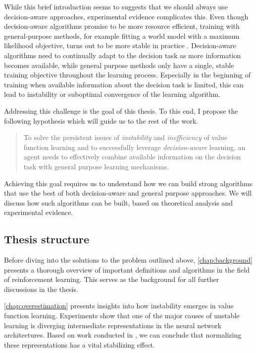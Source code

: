 While this brief introduction seems to suggests that we should always use decision-aware approaches, experimental evidence complicates this.
Even though decision-aware algorithms promise to be more resource efficient, training with general-purpose methods, for example fitting a world model with a maximum likelihood objective, turns out to be more stable in practice \parencite{lovatto2020decision,voelcker2022value}.
Decision-aware algorithms need to continually adapt to the decision task as more information becomes available, while general purpose methods only have a single, stable training objective throughout the learning process.
Especially in the beginning of training when available information about the decision task is limited, this can lead to instability or suboptimal convergence of the learning algorithm.

Addressing this challenge is the goal of this thesis.
To this end, I propose the following hypothesis which will guide us to the rest of the work.

\begin{quote}
	To solve the persistent issues of \emph{instability} and \emph{inefficiency} of value function learning and to successfully leverage \emph{decision-aware} learning, an agent needs to effectively combine available information on the decision task with general purpose learning mechanisms.
\end{quote}

Achieving this goal requires us to understand how we can build strong algorithms that use the best of both decision-aware and general purpose approaches.
We will discuss how such algorithms can be built, based on theoretical analysis and experimental evidence.

\subsection{Thesis structure}

Before diving into the solutions to the problem outlined above, \autoref{chap:background} presents a thorough overview of important definitions and algorithms in the field of reinforcement learning.
This serves as the background for all further discussions in the thesis.

\autoref{chap:overestimation} presents insights into how instability emerges in value function learning.
Experiments show that one of the major causes of unstable learning is diverging intermediate representations in the neural network architectures.
Based on work conducted in \textcite{hussing2024dissecting}, we can conclude that normalizing these representations has a vital stabilizing effect.

